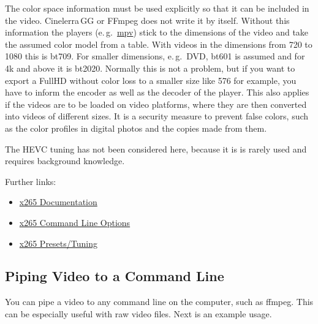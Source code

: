 The color space information must be used explicitly so that it can
be included in the video. Cinelerra\,GG or FFmpeg does not write it
by itself. Without this information the players (e.\,g.\ \href{https://mpv.io/}{mpv}) stick to the dimensions of the video and take the assumed color model from a table. With videos in the dimensions from 720 to 1080 this is bt709. For smaller dimensions, e.\,g.\ DVD, bt601 is assumed and for 4k and above it is bt2020. Normally this is not a problem, but if you want to export a FullHD without color loss to a smaller size like 576 for example, you have to inform the encoder as well as the decoder of the player. This also applies if the videos are to be loaded on video platforms, where they are then converted into videos of different sizes. It is a security measure to prevent false colors, such as the color profiles in digital photos and the copies made from them.

The HEVC tuning has not been considered here, because it is is
rarely used and requires background knowledge.

Further links:
\begin{itemize}
    \item \href{http://x265.readthedocs.org/en/default/}{x265
        Documentation}
    \item \href{http://x265.readthedocs.org/en/latest/cli.html}{x265
        Command Line Options}
    \item \href{http://x265.readthedocs.org/en/latest/presets.html}{x265
        Presets/Tuning}
\end{itemize}

\subsection{Piping Video to a Command Line}%
\label{sub:piping_video_command_line}

You can pipe a video to any command line on the computer, such as ffmpeg.  This can be especially useful with raw video files.  Next is an example usage.

